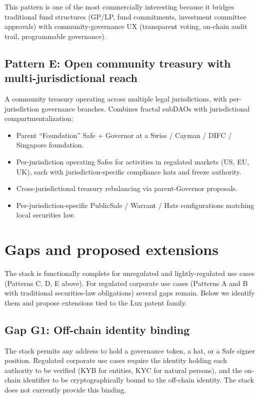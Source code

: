 \documentclass[11pt,letterpaper]{article}
\begin{document}
This pattern is one of the most commercially interesting because it bridges traditional fund structures (GP/LP, fund commitments, investment committee approvals) with community-governance UX (transparent voting, on-chain audit trail, programmable governance).

\subsection{Pattern E: Open community treasury with multi-jurisdictional reach}

A community treasury operating across multiple legal jurisdictions, with per-jurisdiction governance branches. Combines fractal subDAOs with jurisdictional compartmentalization:

\begin{itemize}
\item Parent ``Foundation'' Safe + Governor at a Swiss / Cayman / DIFC / Singapore foundation.
\item Per-jurisdiction operating Safes for activities in regulated markets (US, EU, UK), each with jurisdiction-specific compliance hats and freeze authority.
\item Cross-jurisdictional treasury rebalancing via parent-Governor proposals.
\item Per-jurisdiction-specific PublicSale / Warrant / Hats configurations matching local securities law.
\end{itemize}

\section{Gaps and proposed extensions}\label{sec:gaps}

The stack is functionally complete for unregulated and lightly-regulated use cases (Patterns C, D, E above). For regulated corporate use cases (Patterns A and B with traditional securities-law obligations) several gaps remain. Below we identify them and propose extensions tied to the Lux patent family.

\subsection{Gap G1: Off-chain identity binding}

The stack permits any address to hold a governance token, a hat, or a Safe signer position. Regulated corporate use cases require the identity holding each authority to be verified (KYB for entities, KYC for natural persons), and the on-chain identifier to be cryptographically bound to the off-chain identity. The stack does not currently provide this binding.
\end{document}
